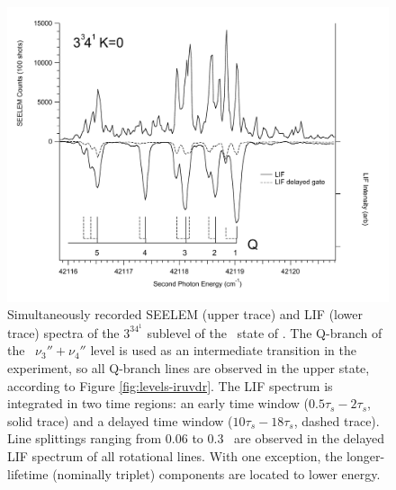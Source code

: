 \documentclass[12pt]{mitthesis}
\begin{document}
\begin{figure}
  \caption{Simultaneously recorded SEELEM (upper trace) and LIF (lower
    trace) spectra of the $3^34^1$  sublevel of the \astate\
    state of .  The Q-branch of the \xstate\ $\nu_3'' +
    \nu_4''$ level is used as an intermediate transition in the
    experiment, so all Q-branch lines are observed in the upper state,
    according to Figure \ref{fig:levels-iruvdr}.  The LIF spectrum is
    integrated in two time regions: an early time window
    ($0.5\tau_s-2\tau_s$, solid trace) and a delayed time window
    ($10\tau_s-18\tau_s$, dashed trace).  Line splittings ranging from
    0.06 to 0.3 \rcm\ are observed in the delayed LIF spectrum of all
    rotational lines.  With one exception, the longer-lifetime
    (nominally triplet) components are located to lower energy.}
  \label{fig:survey-3341}
  \centering
  \includegraphics[width=7in,angle=90]{spectrum-3341-q5q1-split.pdf}
\end{figure}
\end{document}
